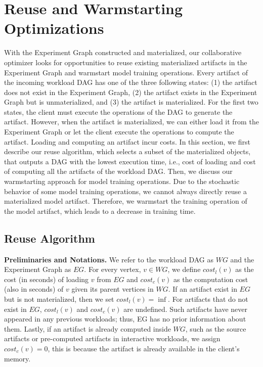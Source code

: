 \section{Reuse and Warmstarting Optimizations}\label{sec-reuse-and-warmstarting}
With the Experiment Graph constructed and materialized, our collaborative optimizer looks for opportunities to reuse existing materialized artifacts in the Experiment Graph and warmstart model training operations.
Every artifact of the incoming workload DAG has one of the three following states: (1) the artifact does not exist in the Experiment Graph, (2) the artifact exists in the Experiment Graph but is unmaterialized, and (3) the artifact is materialized.
For the first two states, the client must execute the operations of the DAG to generate the artifact.
However, when the artifact is materialized, we can either load it from the Experiment Graph or let the client execute the operations to compute the artifact.
Loading and computing an artifact incur costs.
In this section, we first describe our reuse algorithm, which selects a subset of the materialized objects, that outputs a DAG with the lowest execution time, i.e., cost of loading and cost of computing all the artifacts of the workload DAG.
Then, we discuss our warmstarting approach for model training operations.
Due to the stochastic behavior of some model training operations, we cannot always directly reuse a materialized model artifact.
Therefore, we warmstart the training operation of the model artifact, which leads to a decrease in training time.

\subsection{Reuse Algorithm} 
\textbf{Preliminaries and Notations.} 
We refer to the workload DAG as $WG$ and the Experiment Graph as $EG$.
For every vertex, $v \in WG$, we define $cost_l(v)$ as the cost (in seconds) of loading $v$ from $EG$ and $cost_c(v)$ as the computation cost (also in seconds) of $v$ given its parent vertices in $WG$.
If an artifact exist in $EG$ but is not materialized, then we set $cost_l(v)=\inf$.
For artifacts that do not exist in $EG$, $cost_l(v)$ and $cost_c(v)$ are undefined.
Such artifacts have never appeared in any previous workloads; thus, EG has no prior information about them.
Lastly, if an artifact is already computed inside $WG$, such as the source artifacts or pre-computed artifacts in interactive workloads, we assign $cost_c(v)=0$, this is because the artifact is already available in the client's memory.

